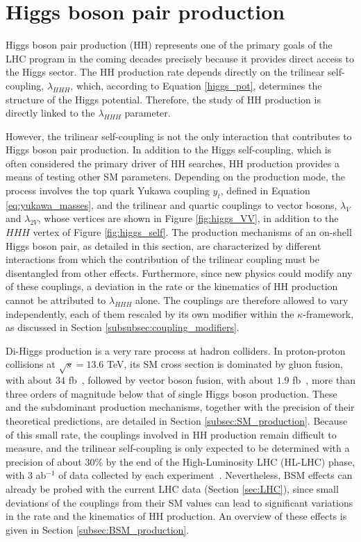 \section{Higgs boson pair production}
\label{sec:HH_production}
%
Higgs boson pair production (HH) represents one of the primary goals of the LHC program in the coming decades precisely because it provides direct access to the Higgs sector. The HH production rate depends directly on the trilinear self-coupling, $\lambda_{HHH}$, which, according to Equation \ref{higgs_pot}, determines the structure of the Higgs potential. Therefore, the study of HH production is directly linked to the $\lambda_{HHH}$ parameter.

However, the trilinear self-coupling is not the only interaction that contributes to Higgs boson pair production. In addition to the Higgs self-coupling, which is often considered the primary driver of HH searches, HH production provides a means of testing other SM parameters. Depending on the production mode, the process involves the top quark Yukawa coupling $y_t$, defined in Equation \ref{eq:yukawa_masses}, and the trilinear and quartic couplings to vector bosons, $\lambda_V$ and $\lambda_{2V}$, whose vertices are shown in Figure \ref{fig:higgs_VV}, in addition to the $HHH$ vertex of Figure \ref{fig:higgs_self}. The production mechanisms of an on-shell Higgs boson pair, as detailed in this section, are characterized by different interactions from which the contribution of the trilinear coupling must be disentangled from other effects. Furthermore, since new physics could modify any of these couplings, a deviation in the rate or the kinematics of HH production cannot be attributed to $\lambda_{HHH}$ alone. The couplings are therefore allowed to vary independently, each of them rescaled by its own modifier within the $\kappa$-framework, as discussed in Section \ref{subsubsec:coupling_modifiers}.

Di-Higgs production is a very rare process at hadron colliders. In proton-proton collisions at $\sqrt{s}=13.6$ TeV, its SM cross section is dominated by gluon fusion, with about $34$ fb~\cite{H:2026ksi}, followed by vector boson fusion, with about $1.9$ fb~\cite{Grober:2026ece}, more than three orders of magnitude below that of single Higgs boson production. These and the subdominant production mechanisms, together with the precision of their theoretical predictions, are detailed in Section \ref{subsec:SM_production}. Because of this small rate, the couplings involved in HH production remain difficult to measure, and the trilinear self-coupling is only expected to be determined with a precision of about $30\%$ by the end of the High-Luminosity LHC (HL-LHC) phase, with $3$ ab$^{-1}$ of data collected by each experiment~\cite{ATLASCMS:2025HLLHC}. Nevertheless, BSM effects can already be probed with the current LHC data (Section \ref{sec:LHC}), since small deviations of the couplings from their SM values can lead to significant variations in the rate and the kinematics of HH production. An overview of these effects is given in Section \ref{subsec:BSM_production}.


